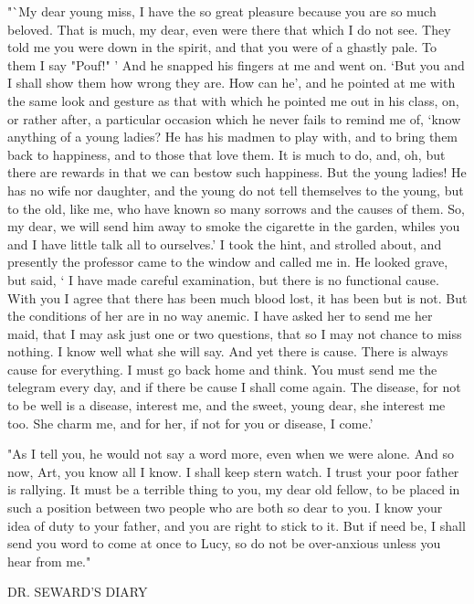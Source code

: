 "`My dear young miss, I have the so great pleasure because you are so much beloved. That is much, my dear, even were there that which I do not see. They told me you were down in the spirit, and that you were of a ghastly pale. To them I say "Pouf!" ' And he snapped his fingers at me and went on. `But you and I shall show them how wrong they are. How can he', and he pointed at me with the same look and gesture as that with which he pointed me out in his class, on, or rather after, a particular occasion which he never fails to remind me of, `know anything of a young ladies? He has his madmen to play with, and to bring them back to happiness, and to those that love them. It is much to do, and, oh, but there are rewards in that we can bestow such happiness. But the young ladies! He has no wife nor daughter, and the young do not tell themselves to the young, but to the old, like me, who have known so many sorrows and the causes of them. So, my dear, we will send him away to smoke the cigarette in the garden, whiles you and I have little talk all to ourselves.' I took the hint, and strolled about, and presently the professor came to the window and called me in. He looked grave, but said, ` I have made careful examination, but there is no functional cause. With you I agree that there has been much blood lost, it has been but is not. But the conditions of her are in no way anemic. I have asked her to send me her maid, that I may ask just one or two questions, that so I may not chance to miss nothing. I know well what she will say. And yet there is cause. There is always cause for everything. I must go back home and think. You must send me the telegram every day, and if there be cause I shall come again. The disease, for not to be well is a disease, interest me, and the sweet, young dear, she interest me too. She charm me, and for her, if not for you or disease, I come.' 

"As I tell you, he would not say a word more, even when we were alone. And so now, Art, you know all I know. I shall keep stern watch. I trust your poor father is rallying. It must be a terrible thing to you, my dear old fellow, to be placed in such a position between two people who are both so dear to you. I know your idea of duty to your father, and you are right to stick to it. But if need be, I shall send you word to come at once to Lucy, so do not be over-anxious unless you hear from me." 

DR. SEWARD'S DIARY 

